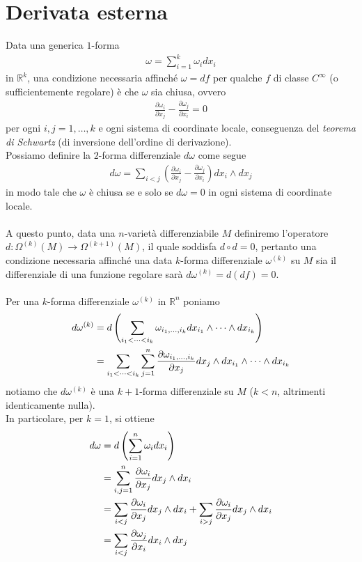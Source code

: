 \documentclass[twoside, 11pt]{amsbook}
\newcommand{\0}{{(0)}}
\newcommand{\3}{{(3)}}
\theoremstyle{colonplain}
\theoremstyle{colondefinition}
\theoremstyle{colonremark}
\numberwithin{equation}{chapter}
\begin{document}
\section{Derivata esterna}
Data una generica $1$-forma 
\begin{align}
    \omega = \sum_{i = 1}^k \omega_i dx_i
\end{align}
in $\mathbb{R}^k$, una condizione necessaria affinché $\omega = df$ per qualche $f$ di classe $C^\infty$ (o sufficientemente regolare) è che $\omega$ sia chiusa, ovvero
\begin{align}
    \frac{\partial \omega_i}{\partial x_j} - \frac{\partial \omega_j}{\partial x_i} = 0
\end{align}
per ogni $i, j = 1, \dots, k$ e ogni sistema di coordinate locale, conseguenza del \textit{teorema di Schwartz} (di inversione dell'ordine di derivazione). \\
Possiamo definire la $2$-forma differenziale $d\omega$ come segue
\begin{align}
    d\omega = \sum_{i < j} \left(\frac{\partial \omega_i}{\partial x_j} - \frac{\partial \omega_j}{\partial x_i}\right)dx_i \wedge dx_j
\end{align}
in modo tale che $\omega$ è chiusa se e solo se $d\omega = 0$ in ogni sistema di coordinate locale. \\ \\
A questo punto, data una $n$-varietà differenziabile $M$ definiremo l'operatore $d : \Omega^{(k)}(M) \longrightarrow \Omega^{(k + 1)}(M)$, il quale soddisfa $d \circ d = 0$, pertanto una condizione necessaria affinché una data $k$-forma differenziale $\omega^{(k)}$ su $M$ sia il differenziale di una funzione regolare sarà $d\omega^{(k)} = d(df) = 0$. \\ \\
Per una $k$-forma differenziale $\omega^{(k)}$ in $\mathbb{R}^n$ poniamo
\begin{align}\label{ExtDiffInR^n}
    d\omega^{(k)} &= d\left(\sum_{i_1 < \dots < i_k} \omega_{i_1, \dots, i_k}dx_{i_1} \wedge \dots \wedge dx_{i_k}\right) \notag \\
    &= \sum_{i_1 < \dots < i_k}\sum_{j = 1}^n \frac{\partial \omega_{i_1, \dots, i_k}}{\partial x_j}dx_j \wedge dx_{i_1} \wedge \dots \wedge dx_{i_k}
\end{align}
notiamo che $d\omega^{(k)}$ è una $k + 1$-forma differenziale su $M$ ($k < n$, altrimenti identicamente nulla). \\
In particolare, per $k = 1$, si ottiene
\begin{align}
    d\omega &= d\left(\sum_{i = 1}^n \omega_i dx_i\right) \notag \\
    &= \sum_{i, j = 1}^n \frac{\partial \omega_i}{\partial x_j}dx_j \wedge dx_i \notag \\
    &= \sum_{i < j}\frac{\partial \omega_i}{\partial x_j}dx_j \wedge dx_i + \sum_{i > j}\frac{\partial \omega_i}{\partial x_j}dx_j \wedge dx_i \notag \\
    &= \sum_{i < j}\frac{\partial \omega_j}{\partial x_i}dx_i \wedge dx_j
\end{align}
\end{document}
